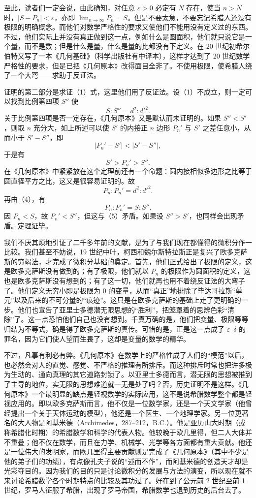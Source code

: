 至此，读者们一定会说，由此确知，对任意 $\varepsilon>0$ 必定有 $N$ 存在，使当 $n>N$ 时，$|S-P_n|<\varepsilon$，亦即 $\lim_{n\to\infty}P_n=S$。但是不要太急，不要忘记希腊人还没有极限的明确概念。而他们对数学严格性的要求又使他们不能用没有定义过的东西。不过，他们实际上并没有真正做到这一点，例如什么是圆面积，他们就只说它是一个量，而不是数；但是什么是量，什么是量的比都没有下定义。在 20 世纪初希尔伯特又写了一本《几何基础》（科学出版社有中译本），这样才达到了 20 世纪数学严格性的要求，但是已把《几何原本》改得面目全非了。不使用极限，使希腊人绕了一个大弯——求助于反证法。

证明的第二部分是求证（1）式，这里他们用了反证法。设（1）不成立，则一定可以找到比例第四项 $S''$ 使
\[
S:S''=d^2:d'^2. \tag{4}
\]
关于比例第四项是否一定存在，《几何原本》又是默认而未证明的。如果 $S''<S'$，则取 $n$ 充分大，如上所述可以使 $S'$ 的内接正 $n$ 边形 $P_n'$ 与 $S'$ 之差任意小，从而小于 $S'-S''$，即
\[
|P_n'-S'|<|S'-S''|,
\]
于是有
\[
S'>P_n'>S''. \tag{5}
\]
在《几何原本》中紧紧放在这个定理前还有一个命题：圆内接相似多边形之比等于圆直径平方之比，这又是很容易证明的。故
\[
P_n:P_n'=d^2:d'^2. \tag{6}
\]
再由（4），有
\[
P_n:P_n'=S:S''.
\]
因 $P_n<S$，故 $P_n'<S''$，但这与（5）矛盾。如果设 $S''>S'$，也同样会出现矛盾。定理证毕。

我们不厌其烦地引证了二千多年前的文献，是为了与我们现在都懂得的微积分作一比较。我们甚至不妨说，19 世纪中叶，柯西和魏尔斯特拉斯正是复兴了欧多克萨斯的穷竭法，才完成了微积分基础的奠定。首先，他们正式给出了极限的定义，这是欧多克萨斯没有做到的；有了极限，他们就以 $P_n$ 的极限作为圆面积的定义，这也是欧多克萨斯没有想到的；有了这一切，他们就再也用不着绕反证法的大弯子了。他们定义无穷小即是极限为 $0$ 的变量，从而“真正”地排除了毕达哥拉斯“单元”以及后来的不可分量的“痕迹”。这只是在欧多克萨斯的基础上走了更明确的一步。他们也宣告了亚里士多德潜无限思想的“胜利”，把笼罩着的思辨色彩“清除”了。这一点恐怕他们自己也没有想到。千真万确的是，他们把变量、极限等等归结为不等式，确是得了欧多克萨斯的真传。可惜的是，正是这一点成了 $\varepsilon$--$\delta$ 的罪名，因为它们使人望而生畏了，这却是变量的数学的精华。

不过，凡事有利必有弊。《几何原本》在数学上的严格性成了人们的“模范”以后，也必然会对人的直觉、感觉、不严格的推理有所排斥。而这种排斥时常也把许多极为生动的、通向真理的其它道路封锁了。以亚里士多德而言，潜无限的思想被推到了主导的地位，实无限的思想难道就一无是处了吗？否，历史证明不是这样。《几何原本》一个最明显的缺点是轻视数学的实际应用，这不是说希腊数学整个都是轻视应用的。即以欧多克萨斯而言，他不仅是一位数学家，还是一个天文学家（他曾经提出一个关于天体运动的模型），他还是一个医生、一个地理学家。另一位更著名的大人物是阿基米德（Archimedes，287--212，B.C.）。他是亚历山大时期（或称希腊化时期）的希腊数学和科学的代表人物。他较晚于欧几里得，但二人大体并不重叠；他不仅在数学，而且在力学、机械学、光学等各方面都有重大贡献。他还是一位伟大的发明家，而欧几里得主要贡献则是完成了《几何原本》（其中不少是他的弟子们的功绩），有点像孔夫子说的“述而不作”，而阿基米德的创造天才却是光彩夺目的。因为我们的目的只是讨论微积分的发展与方法的演变，所以现在就不来讨论希腊数学各个时期特点的比较及其功过了。好在到了公元前 2 世纪至前 1 世纪，罗马人征服了希腊，出现了罗马帝国，希腊数学也退到历史的后台去了。

